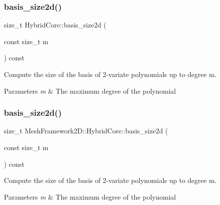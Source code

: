 \subsubsection{\texorpdfstring{basis\+\_\+size2d()}{basis\_size2d()}\hspace{0.1cm}{\footnotesize\ttfamily [1/2]}}
{\footnotesize\ttfamily size\+\_\+t Hybrid\+Core\+::basis\+\_\+size2d (\begin{DoxyParamCaption}\item[{const size\+\_\+t}]{m }\end{DoxyParamCaption}) const}



Compute the size of the basis of 2-\/variate polynomials up to degree m. 


\begin{DoxyParams}{Parameters}
{\em m} & The maximum degree of the polynomial \\
\hline
\end{DoxyParams}
\mbox{\label{classMeshFramework2D_1_1HybridCore_af6f2cd27f9ab6269de1b7c4768b21ed0}} 
\subsubsection{\texorpdfstring{basis\+\_\+size2d()}{basis\_size2d()}\hspace{0.1cm}{\footnotesize\ttfamily [2/2]}}
{\footnotesize\ttfamily size\+\_\+t Mesh\+Framework2\+D\+::\+Hybrid\+Core\+::basis\+\_\+size2d (\begin{DoxyParamCaption}\item[{const size\+\_\+t}]{m }\end{DoxyParamCaption}) const}



Compute the size of the basis of 2-\/variate polynomials up to degree m. 


\begin{DoxyParams}{Parameters}
{\em m} & The maximum degree of the polynomial \\
\hline
\end{DoxyParams}
\mbox{\label{classMeshFramework2D_1_1HybridCore_a8ae6e62f18213ca052e181f09ae63556}} 
